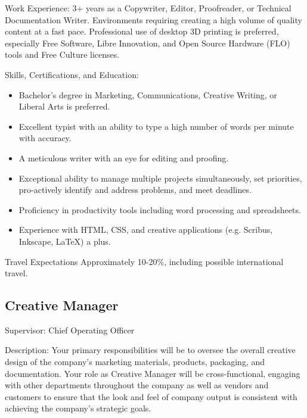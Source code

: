 Work Experience:
3+ years as a Copywriter, Editor, Proofreader, or Technical Documentation Writer.
Environments requiring creating a high volume of quality content at a fast pace. 
Professional use of desktop 3D printing is preferred, especially Free Software, Libre Innovation, and Open Source Hardware (FLO) tools and Free Culture licenses.

Skills, Certifications, and Education:
\begin{itemize}
 \item Bachelor’s degree in Marketing, Communications, Creative Writing, or Liberal Arts is preferred.
 \item Excellent typist with an ability to type a high number of words per minute with accuracy.
 \item A meticulous writer with an eye for editing and proofing.
 \item Exceptional ability to manage multiple projects simultaneously, set priorities, pro-actively identify and address problems, and meet deadlines.
 \item Proficiency in productivity tools including word processing and spreadsheets.
 \item Experience with HTML, CSS, and creative applications (e.g. Scribus, Inkscape, \LaTeX) a plus.
\end{itemize}

Travel Expectations
Approximately 10-20\%, including possible international travel.

\subsection{Creative Manager}
Supervisor: Chief Operating Officer

Description: Your primary responsibilities will be to oversee the overall creative design of the company’s marketing materials, products, packaging, and documentation. Your role as Creative Manager will be cross-functional, engaging with other departments throughout the company as well as vendors and customers to ensure that the look and feel of company output is consistent with achieving the company's strategic goals.

